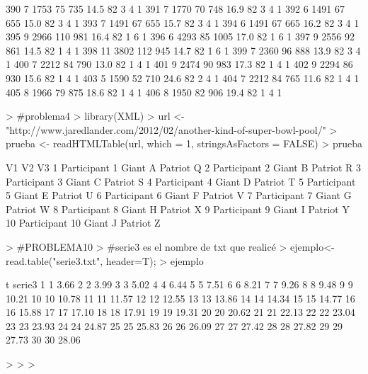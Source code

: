 \documentclass{article}
\begin{document}
\begin{Schunk}
\begin{Soutput}
390       7  1753  75  735 14.5  82      3       4        1
391       7  1770  70  748 16.9  82      3       4        1
392       6  1491  67  655 15.0  82      3       4        1
393       7  1491  67  655 15.7  82      3       4        1
394       6  1491  67  665 16.2  82      3       4        1
395       9  2966 110  981 16.4  82      1       6        1
396       6  4293  85 1005 17.0  82      1       6        1
397       9  2556  92  861 14.5  82      1       4        1
398      11  3802 112  945 14.7  82      1       6        1
399       7  2360  96  888 13.9  82      3       4        1
400       7  2212  84  790 13.0  82      1       4        1
401       9  2474  90  983 17.3  82      1       4        1
402       9  2294  86  930 15.6  82      1       4        1
403       5  1590  52  710 24.6  82      2       4        1
404       7  2212  84  765 11.6  82      1       4        1
405       8  1966  79  875 18.6  82      1       4        1
406       8  1950  82  906 19.4  82      1       4        1
\end{Soutput}
\begin{Sinput}
> #problema4
> library(XML)
> url <- "http://www.jaredlander.com/2012/02/another-kind-of-super-bowl-pool/" 
> prueba <- readHTMLTable(url, which = 1, stringsAsFactors = FALSE)
> prueba
\end{Sinput}
\begin{Soutput}
               V1      V2        V3
1   Participant 1 Giant A Patriot Q
2   Participant 2 Giant B Patriot R
3   Participant 3 Giant C Patriot S
4   Participant 4 Giant D Patriot T
5   Participant 5 Giant E Patriot U
6   Participant 6 Giant F Patriot V
7   Participant 7 Giant G Patriot W
8   Participant 8 Giant H Patriot X
9   Participant 9 Giant I Patriot Y
10 Participant 10 Giant J Patriot Z
\end{Soutput}
\begin{Sinput}
> #PROBLEMA10
> #serie3 es el nombre de txt que realicé
> ejemplo<-read.table("serie3.txt", header=T);
> ejemplo
\end{Sinput}
\begin{Soutput}
    t serie3
1   1   3.66
2   2   3.99
3   3   5.02
4   4   6.44
5   5   7.51
6   6   8.21
7   7   9.26
8   8   9.48
9   9  10.21
10 10  10.78
11 11  11.57
12 12  12.55
13 13  13.86
14 14  14.34
15 15  14.77
16 16  15.88
17 17  17.10
18 18  17.91
19 19  19.31
20 20  20.62
21 21  22.13
22 22  23.04
23 23  23.93
24 24  24.87
25 25  25.83
26 26  26.09
27 27  27.42
28 28  27.82
29 29  27.73
30 30  28.06
\end{Soutput}
\begin{Sinput}
> 
> 
> 
\end{Sinput}
\end{Schunk}
\end{document}
